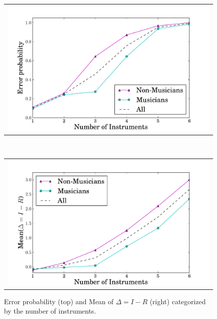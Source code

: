 \begin{figure}[h]
\centering
\begin{minipage}{0.8\textwidth}
\begin{tabular}{c}
    \includegraphics[width=\textwidth]{Chapters/07_Analysis_Experiment/images/error_means.pdf}
\end{tabular}
\end{minipage}
\\
\begin{minipage}{0.8\textwidth}
\begin{tabular}{c}
    \includegraphics[width=\textwidth]{Chapters/07_Analysis_Experiment/images/error_diff.pdf}
\end{tabular}
\end{minipage}
\caption{Error probability (top) and Mean of $\Delta = I-R$ (right) categorized by the number of instruments.}
\label{fig:meanerror}
\end{figure}

